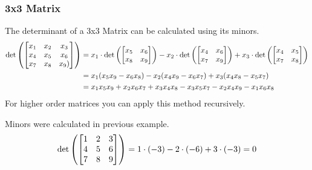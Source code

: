 \subsubsection{3x3 Matrix}
The determinant of a 3x3 Matrix can be calculated using its minors.
\begin{align*}
    \det \left( \begin{bmatrix}
            x_1 & x_2 & x_3  \\
            x_4 & x_5 & x_6  \\
            x_7 & x_8 & x_9) \\
        \end{bmatrix} \right) & = x_1 \cdot
    \det \left( \begin{bmatrix}
            x_5 & x_6 \\
            x_8 & x_9 \\
        \end{bmatrix} \right)- x_2 \cdot
    \det \left( \begin{bmatrix}
            x_4 & x_6 \\
            x_7 & x_9 \\
        \end{bmatrix} \right)+ x_3 \cdot \det \left( \begin{bmatrix}
            x_4 & x_5 \\
            x_7 & x_8 \\
        \end{bmatrix} \right)                                  \\
                                              & = x_1 (x_5x_9 - x_6 x_8) - x_2 (x_4 x_9 - x_6 x_7) + x_3 (x_4 x_8 - x_5 x_7)        \\
                                              & = x_1 x_5 x_9 + x_2 x_6 x_7 + x_3 x_4 x_8 - x_3 x_5 x_7 - x_2 x_4 x_9 - x_1 x_6 x_8
\end{align*}
For higher order matrices you can apply this method recursively.
\begin{example}
    Minors were calculated in previous example.
    \begin{align*}
        \det \left( \begin{bmatrix}
                1 & 2 & 3 \\
                4 & 5 & 6 \\
                7 & 8 & 9 \\
            \end{bmatrix} \right) & = 1 \cdot(-3) - 2 \cdot(-6) + 3 \cdot(-3) = 0 \\
    \end{align*}
\end{example}
